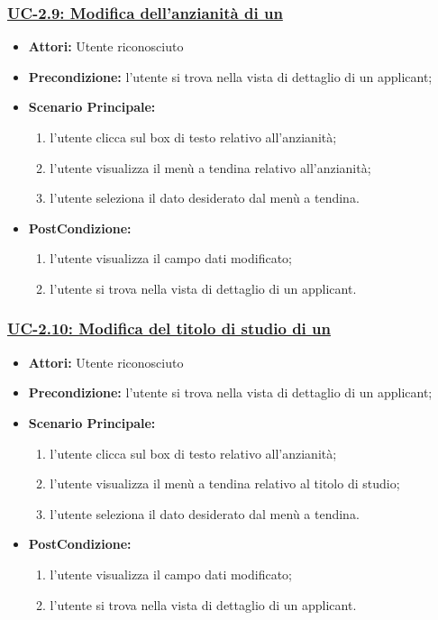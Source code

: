 \subsubsection{\underline{UC-2.9: Modifica dell'anzianità di un \applicant}}
\begin{itemize}
	\item \textbf{Attori:} Utente riconosciuto
	\item \textbf{Precondizione:}  l'utente si trova nella vista di dettaglio di un applicant;
	\item \textbf{Scenario Principale:}
	\begin{enumerate}
		\item l'utente clicca sul box di testo relativo all'anzianità;
		\item l'utente visualizza il menù a tendina relativo all'anzianità;
		\item l'utente seleziona il dato desiderato dal menù a tendina.
	\end{enumerate}
	\item \textbf{PostCondizione:} 
	\begin{enumerate}
		\item l'utente visualizza il campo dati modificato;
		\item l'utente si trova nella vista di dettaglio di un applicant.
	\end{enumerate}
	
\end{itemize}

\subsubsection{\underline{UC-2.10: Modifica del titolo di studio di un \applicant}}
\begin{itemize}
	\item \textbf{Attori:} Utente riconosciuto
	\item \textbf{Precondizione:}  l'utente si trova nella vista di dettaglio di un applicant;
	\item \textbf{Scenario Principale:}
	\begin{enumerate}
		\item l'utente clicca sul box di testo relativo all'anzianità;
		\item l'utente visualizza il menù a tendina relativo al titolo di studio;
		\item l'utente seleziona il dato desiderato dal menù a tendina.
	\end{enumerate}
	\item \textbf{PostCondizione:} 
	\begin{enumerate}
		\item l'utente visualizza il campo dati modificato;
		\item l'utente si trova nella vista di dettaglio di un applicant.
	\end{enumerate}
	
\end{itemize}


